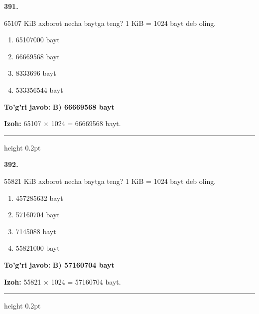 \documentclass[10pt,a4paper,oneside]{article}
\begin{document}
\noindent\textbf{\color{ink}391.}
\par
65107 KiB axborot necha baytga teng? 1 KiB = 1024 bayt deb oling.
\begin{enumerate}[label=\Alph*),leftmargin=9mm]
\item 65107000 bayt
\item 66669568 bayt
\item 8333696 bayt
\item 533356544 bayt
\end{enumerate}
\begin{tcolorbox}[enhanced,breakable,colback=teal!4,colframe=teal!50!black,boxrule=0.5pt,arc=1.1mm,left=3mm,right=3mm,top=1.7mm,bottom=1.7mm,before skip=2mm,after skip=2mm]
\textbf{\color{teal}To'g'ri javob:} \textbf{B) 66669568 bayt}
\par\smallskip
\textbf{Izoh:} 65107 \ensuremath{\times} 1024 = 66669568 bayt.
\end{tcolorbox}
\vspace{2mm}\hrule height 0.2pt \vspace{3mm}

\noindent\textbf{\color{ink}392.}
\par
55821 KiB axborot necha baytga teng? 1 KiB = 1024 bayt deb oling.
\begin{enumerate}[label=\Alph*),leftmargin=9mm]
\item 457285632 bayt
\item 57160704 bayt
\item 7145088 bayt
\item 55821000 bayt
\end{enumerate}
\begin{tcolorbox}[enhanced,breakable,colback=teal!4,colframe=teal!50!black,boxrule=0.5pt,arc=1.1mm,left=3mm,right=3mm,top=1.7mm,bottom=1.7mm,before skip=2mm,after skip=2mm]
\textbf{\color{teal}To'g'ri javob:} \textbf{B) 57160704 bayt}
\par\smallskip
\textbf{Izoh:} 55821 \ensuremath{\times} 1024 = 57160704 bayt.
\end{tcolorbox}
\vspace{2mm}\hrule height 0.2pt \vspace{3mm}
\end{document}
